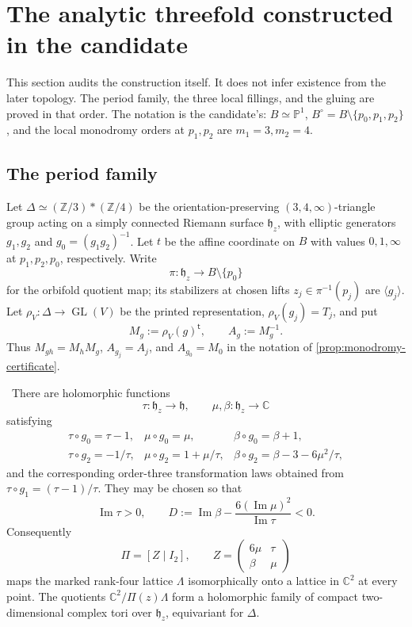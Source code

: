 \section{The analytic threefold constructed in the candidate}
\label{sec:candidate-geometry}

This section audits the construction itself.  It does not infer existence
from the later topology.  The period family, the three local fillings, and
the gluing are proved in that order.  The notation is the candidate's:
\(B\simeq\mathbb P^1\),
\(B^\circ=B\setminus\{p_0,p_1,p_2\}\), and the local monodromy orders at
\(p_1,p_2\) are \(m_1=3,m_2=4\).

\subsection{The period family}

Let \(\Delta\simeq(\mathbb Z/3)*(\mathbb Z/4)\) be the orientation-preserving
\((3,4,\infty)\)-triangle group acting on a simply connected Riemann surface
\(\mathfrak h_z\), with elliptic generators \(g_1,g_2\) and
\(g_0=(g_1g_2)^{-1}\).  Let \(t\) be the affine coordinate on
\(B\) with values \(0,1,\infty\) at \(p_1,p_2,p_0\), respectively.
Write
\[
 \pi:\mathfrak h_z\longrightarrow B\setminus\{p_0\}
\]
for the orbifold quotient map; its stabilizers at chosen lifts
\(z_j\in\pi^{-1}(p_j)\) are \(\langle g_j\rangle\).  Let
\(\rho_V:\Delta\to\operatorname{GL}(V)\) be the printed representation,
\(\rho_V(g_j)=T_j\), and put
\[
 M_g:=\rho_V(g)^{\mathsf t},\qquad A_g:=M_g^{-1}.
\]
Thus \(M_{gh}=M_hM_g\), \(A_{g_j}=A_j\), and
\(A_{g_0}=M_0\) in the notation of \cref{prop:monodromy-certificate}.

\begin{proposition}
\label{prop:period-input-audit}
\Verified\ There are holomorphic functions
\[
 \tau:\mathfrak h_z\to\mathfrak h,
 \qquad \mu,\beta:\mathfrak h_z\to\mathbb C
\]
satisfying
\[
\begin{array}{lll}
\tau\circ g_0=\tau-1,&\mu\circ g_0=\mu,&\beta\circ g_0=\beta+1,\\
\tau\circ g_2=-1/\tau,&\mu\circ g_2=1+\mu/\tau,
 &\beta\circ g_2=\beta-3-6\mu^2/\tau,
\end{array}
\tag{2.1}
\]
and the corresponding order-three transformation laws obtained from
\(\tau\circ g_1=(\tau-1)/\tau\).  They may be chosen so that
\[
 \operatorname{Im}\tau>0,
 \qquad
 D:=\operatorname{Im}\beta-
 \frac{6(\operatorname{Im}\mu)^2}{\operatorname{Im}\tau}<0.
\tag{2.2}
\]
Consequently
\[
 \Pi=[Z\mid I_2],\qquad
 Z=\begin{pmatrix}6\mu&\tau\\ \beta&\mu\end{pmatrix}
\tag{2.3}
\]
maps the marked rank-four lattice \(\Lambda\) isomorphically onto a lattice
in \(\mathbb C^2\) at every point.  The quotients
\(\mathbb C^2/\Pi(z)\Lambda\) form a holomorphic family of compact
two-dimensional complex tori over \(\mathfrak h_z\), equivariant for
\(\Delta\).
\end{proposition}

